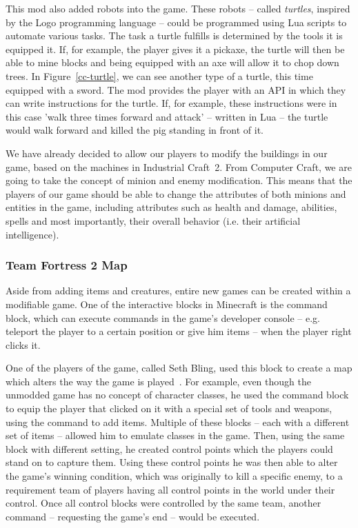 This mod also added robots into the game. These robots -- called \emph{turtles}, inspired by the Logo programming language -- 
could be programmed using Lua scripts to automate 
various tasks. The task a turtle fulfills is determined by the tools it is equipped it. If, for example, the player gives it a pickaxe, 
the turtle will then be able to mine blocks and being equipped with an axe will allow it to chop down trees. 
In Figure~\ref{cc-turtle}, we
can see another type of a turtle, this time equipped with a sword. The mod provides the player with an API in which they can write
instructions for the turtle. If, for example, these instructions were in this case 'walk three times forward and attack' 
-- written in Lua -- the turtle would walk forward and killed the pig standing in front of it.

We have already decided to allow our players to modify the buildings in our game, based on the machines in Industrial Craft~2. 
From Computer Craft, we are going to take the concept of minion and enemy modification. This means that the players
of our game should be able to change the attributes of both minions and entities in the game, including attributes such as health and
damage, abilities, spells and most importantly, their overall behavior (i.e. their artificial intelligence).

\subsubsection{Team Fortress 2 Map}

Aside from adding items and creatures, entire new games can be created within a modifiable game.
One of the interactive blocks in Minecraft is the command block,
which can execute commands in the game's developer console -- e.g. teleport the player to a certain position or give him items --
when the player right clicks it.

One of the players of the game, called Seth Bling, used this block to create a map which alters the way the game is 
played~\cite{FutureOfMinecraft}. For example, even though the 
unmodded game has no concept of character classes, he used the command block to equip the player that clicked on it with a special
set of tools and weapons, using the command to add items. Multiple of these blocks -- each with a different set of items -- 
allowed him to emulate classes in the game. Then, using the same block with different setting, he created control points which
the players could stand on to capture them. Using these control points he was then able to alter the game's winning condition, which
was originally to kill a specific enemy, to a requirement team of players having all control points in the world under their control.
Once all control blocks were controlled by the same team, another command -- requesting the game's end -- would be executed.

